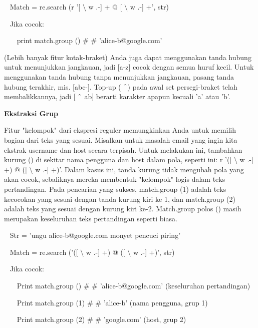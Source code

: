 \vspace{12pt}
\noindent 
~ Match = re.search (r '[ $  \setminus  $ w .-] + @ [ $  \setminus  $ w .-] +', str) \par
\noindent 
~ Jika cocok: \par
\noindent 
~~~ print match.group ()  $  \#  $ $  \#  $ 'alice-b@google.com' \par
\vspace{12pt}
(Lebih banyak fitur kotak-braket) Anda juga dapat menggunakan tanda hubung untuk menunjukkan jangkauan, jadi [a-z] cocok dengan semua huruf kecil. Untuk menggunakan tanda hubung tanpa menunjukkan jangkauan, pasang tanda hubung terakhir, mis. [abc-]. Top-up ( $  \string^  $) pada awal set persegi-braket telah membalikkannya, jadi [ $  \string^  $ ab] berarti karakter apapun kecuali 'a' atau 'b'. \par
\vspace{16pt}
{\fontsize{14pt}{14pt}\selectfont \textbf{Ekstraksi Grup} \\} \par
Fitur "kelompok" dari ekspresi reguler memungkinkan Anda untuk memilih bagian dari teks yang sesuai. Misalkan untuk masalah email yang ingin kita ekstrak username dan host secara terpisah. Untuk melakukan ini, tambahkan kurung () di sekitar nama pengguna dan host dalam pola, seperti ini: r '([ $  \setminus  $ w .-] +) @ ([ $  \setminus  $ w .-] +)'. Dalam kasus ini, tanda kurung tidak mengubah pola yang akan cocok, sebaliknya mereka membentuk "kelompok" logis dalam teks pertandingan. Pada pencarian yang sukses, match.group (1) adalah teks kecocokan yang sesuai dengan tanda kurung kiri ke 1, dan match.group (2) adalah teks yang sesuai dengan kurung kiri ke-2. Match.group polos () masih merupakan keseluruhan teks pertandingan seperti biasa. \par
\vspace{12pt}
\noindent 
~ Str = 'ungu alice-b@google.com monyet pencuci piring' \par
\noindent 
~ Match = re.search ('([ $  \setminus  $ w .-] +) @ ([ $  \setminus  $ w .-] +)', str) \par
\noindent 
~ Jika cocok: \par
\noindent 
~~~ Print match.group ()  $  \#  $ $  \#  $ 'alice-b@google.com' (keseluruhan pertandingan) \par
\noindent 
~~~ Print match.group (1)  $  \#  $ $  \#  $ 'alice-b' (nama pengguna, grup 1) \par
\noindent 
~~~ Print match.group (2)  $  \#  $ $  \#  $ 'google.com' (host, grup 2) \par
